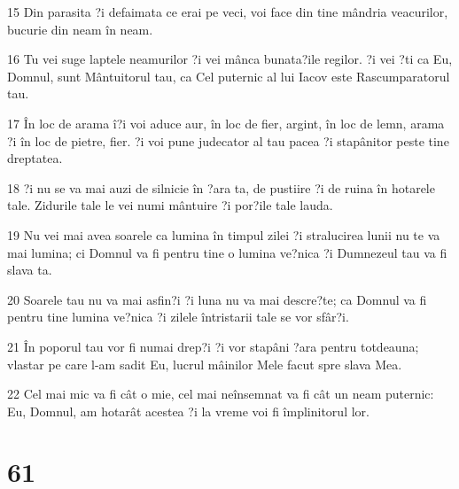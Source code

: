 \par 15 Din parasita ?i defaimata ce erai pe veci, voi face din tine mândria veacurilor, bucurie din neam în neam.
\par 16 Tu vei suge laptele neamurilor ?i vei mânca bunata?ile regilor. ?i vei ?ti ca Eu, Domnul, sunt Mântuitorul tau, ca Cel puternic al lui Iacov este Rascumparatorul tau.
\par 17 În loc de arama î?i voi aduce aur, în loc de fier, argint, în loc de lemn, arama ?i în loc de pietre, fier. ?i voi pune judecator al tau pacea ?i stapânitor peste tine dreptatea.
\par 18 ?i nu se va mai auzi de silnicie în ?ara ta, de pustiire ?i de ruina în hotarele tale. Zidurile tale le vei numi mântuire ?i por?ile tale lauda.
\par 19 Nu vei mai avea soarele ca lumina în timpul zilei ?i stralucirea lunii nu te va mai lumina; ci Domnul va fi pentru tine o lumina ve?nica ?i Dumnezeul tau va fi slava ta.
\par 20 Soarele tau nu va mai asfin?i ?i luna nu va mai descre?te; ca Domnul va fi pentru tine lumina ve?nica ?i zilele întristarii tale se vor sfâr?i.
\par 21 În poporul tau vor fi numai drep?i ?i vor stapâni ?ara pentru totdeauna; vlastar pe care l-am sadit Eu, lucrul mâinilor Mele facut spre slava Mea.
\par 22 Cel mai mic va fi cât o mie, cel mai neînsemnat va fi cât un neam puternic: Eu, Domnul, am hotarât acestea ?i la vreme voi fi împlinitorul lor.

\chapter{61}

